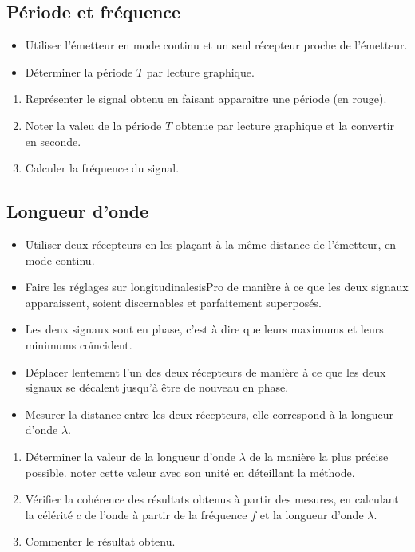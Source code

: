 \documentclass[a4paper,11pt,fleqn]{scrartcl}%
\begin{document}
\subsection{Période et fréquence}
\begin{protocole}
    \begin{itemize}
        \item Utiliser l'émetteur en mode continu et un seul récepteur proche de l'émetteur.
        \item Déterminer la période $T$ par lecture graphique.
    \end{itemize}
\end{protocole}
\begin{enumerate}[resume]
    \item Représenter le signal obtenu en faisant apparaitre une période (en rouge).
    \item Noter la valeu de la période $T$ obtenue par lecture graphique et la convertir en seconde.
    \item Calculer la fréquence du signal.
\end{enumerate}

\subsection{Longueur d'onde}
\begin{protocole}
    \begin{itemize}
        \item Utiliser deux récepteurs en les plaçant à la même distance de l'émetteur, en mode continu.
        \item Faire les réglages sur longitudinalesisPro de manière à ce que les deux signaux apparaissent, soient discernables et parfaitement superposés.
        \item Les deux signaux sont en phase, c'est à dire que leurs maximums et leurs minimums coïncident.
        \item Déplacer lentement l'un des deux récepteurs de manière à ce que les deux signaux se décalent jusqu'à être de nouveau en phase.
        \item Mesurer la distance entre les deux récepteurs, elle correspond à la longueur d'onde $\lambda$.
    \end{itemize}
\end{protocole}

\begin{enumerate}[resume]
    \item Déterminer la valeur de la longueur d'onde $\lambda$ de la manière la plus précise possible. noter cette valeur avec son unité en déteillant la méthode.
    \item Vérifier la cohérence des résultats obtenus à partir des mesures, en calculant la célérité $c$ de l'onde à partir de la fréquence $f$ et la longueur d'onde $\lambda$.
    \item Commenter le résultat obtenu.
\end{enumerate}
\end{document}
